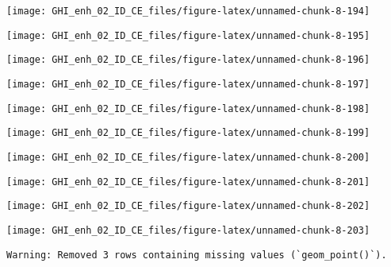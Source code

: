 \documentclass[
  10pt,
  a4paper,oneside]{article}
\begin{document}
\begin{center}\texttt{[image: GHI\_enh\_02\_ID\_CE\_files/figure-latex/unnamed-chunk-8-194]} \end{center}

\begin{center}\texttt{[image: GHI\_enh\_02\_ID\_CE\_files/figure-latex/unnamed-chunk-8-195]} \end{center}

\begin{center}\texttt{[image: GHI\_enh\_02\_ID\_CE\_files/figure-latex/unnamed-chunk-8-196]} \end{center}

\begin{center}\texttt{[image: GHI\_enh\_02\_ID\_CE\_files/figure-latex/unnamed-chunk-8-197]} \end{center}

\begin{center}\texttt{[image: GHI\_enh\_02\_ID\_CE\_files/figure-latex/unnamed-chunk-8-198]} \end{center}

\begin{center}\texttt{[image: GHI\_enh\_02\_ID\_CE\_files/figure-latex/unnamed-chunk-8-199]} \end{center}

\begin{center}\texttt{[image: GHI\_enh\_02\_ID\_CE\_files/figure-latex/unnamed-chunk-8-200]} \end{center}

\begin{center}\texttt{[image: GHI\_enh\_02\_ID\_CE\_files/figure-latex/unnamed-chunk-8-201]} \end{center}

\begin{center}\texttt{[image: GHI\_enh\_02\_ID\_CE\_files/figure-latex/unnamed-chunk-8-202]} \end{center}

\begin{center}\texttt{[image: GHI\_enh\_02\_ID\_CE\_files/figure-latex/unnamed-chunk-8-203]} \end{center}

\begin{verbatim}
Warning: Removed 3 rows containing missing values (`geom_point()`).
\end{verbatim}
\end{document}
